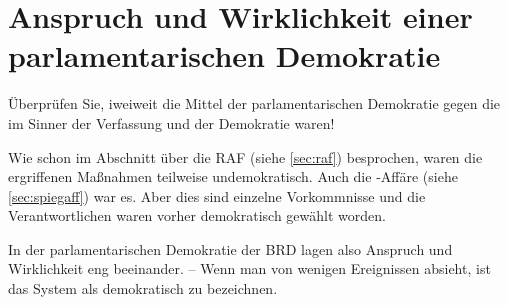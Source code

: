 \section{Anspruch und Wirklichkeit einer parlamentarischen Demokratie}

\begin{aufgabe}
Überprüfen Sie, iweiweit die Mittel der parlamentarischen Demokratie
gegen die  im Sinner der Verfassung
und der Demokratie waren!
\end{aufgabe}

Wie schon im Abschnitt über die RAF (siehe \ref{sec:raf}) besprochen,
waren die ergriffenen Maßnahmen teilweise undemokratisch. Auch die
-Affäre (siehe \ref{sec:spiegaff}) war es. Aber dies
sind einzelne Vorkommnisse und die Verantwortlichen waren vorher
demokratisch gewählt worden.

In der parlamentarischen Demokratie der BRD lagen also Anspruch und
Wirklichkeit eng beeinander. -- Wenn man von wenigen Ereignissen
absieht, ist das System als demokratisch zu bezeichnen.

